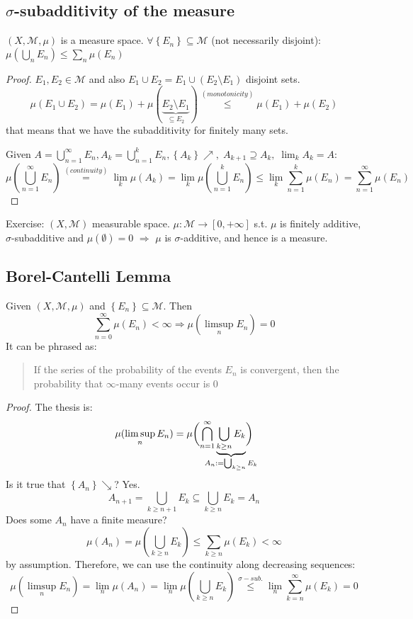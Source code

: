 \subsection{\texorpdfstring{\(\sigma\)}{sigma}-subadditivity of the measure}
\begin{theorem}
\((X, \mathcal{M}, \mu)\) is a measure space. \(\forall \left\lbrace E_n \right\rbrace \subseteq \mathcal{M}\) (not necessarily disjoint): \(\mu\left(\bigcup_n E_n\right) \leq \sum_n \mu(E_n)\)
\end{theorem}
\begin{proof}
    \(E_1, E_2 \in \mathcal{M}\) and also \(E_1 \cup E_2 = E_1 \cup (E_2 \setminus E_1)\) disjoint sets.
    \[
        \mu(E_1 \cup E_2) = \mu(E_1) + \mu(\underbrace{E_2 \setminus E_1}_{\subseteq E_2}) \overset{(monotonicity)}{\leq} \mu(E_1) + \mu(E_2)
    \]
    that means that we have the subadditivity for finitely many sets.

    \noindent Given \(
        A = \bigcup_{n=1}^{\infty} E_n, A_k = \bigcup_{n = 1}^{k} E_n,
        \left\lbrace A_k \right\rbrace \nearrow, \; A_{k+1} \supseteq A_k, \; \lim_k A_k = A:
    \)
    \[
        \mu\left(\bigcup_{n = 1}^{\infty} E_n\right) \overset{(continuity)}{=} \lim_k \mu(A_k) = \lim_k \mu \left(\bigcup_{n=1}^{k} E_n\right) \leq \lim_k \sum_{n=1}^k \mu(E_n) = \sum_{n = 1}^{\infty} \mu(E_n)
\]
\end{proof}
Exercise: \((X, \mathcal{M})\) measurable space. \(\mu : \mathcal{M} \to [0, +\infty]\) s.t. \(\mu\) is finitely additive, \(\sigma\)-subadditive and \(\mu(\emptyset) = 0\) \(\Rightarrow\) \(\mu\) is \(\sigma\)-additive, and hence is a measure.  
\subsection{Borel-Cantelli Lemma}
\begin{lemma}
    Given \((X, \mathcal{M}, \mu)\) and \(\left\lbrace E_n \right\rbrace \subseteq \mathcal{M}\). Then
    \[
        \sum_{n=0}^{\infty} \mu(E_n) < \infty \Rightarrow \mu(\limsup_n E_n) = 0
    \]
    It can be phrased as: \begin{quote}
        If the series of the probability of the events \(E_n\) is convergent, then the probability that \(\infty\)-many events occur is \(0\)
    \end{quote}
\end{lemma}
\begin{proof}
    The thesis is: \[\mu(\limsup_n E_n) = \mu\biggl(\bigcap_{n=1}^{\infty} \underbrace{\bigcup_{k \geq n} E_k}_{\mathclap{A_n := \bigcup_{k\geq n}E_k}}\biggr)\]
    Is it true that \(\left\lbrace A_n \right\rbrace \searrow\)? Yes.
    \[
         A_{n+1} = \bigcup_{k \geq n+1}  E_k \subseteq \bigcup_{k \geq n} E_k = A_n
    \]
    Does some \(A_n\) have a finite measure? 
    \[
        \mu(A_n) = \mu\left(\bigcup_{k \geq n} E_k\right) \leq \sum_{k \geq n} \mu(E_k) < \infty
    \]
    by assumption. Therefore, we can use the continuity along decreasing sequences: 
    \[
        \mu(\limsup_n E_n) = \lim_n \mu(A_n) = \lim_n \mu \left(\bigcup_{k \geq n} E_k\right) \overset{\sigma-sub.}{\leq} \lim_n \sum_{k=n}^{\infty} \mu(E_k) = 0
    \]
\end{proof}
